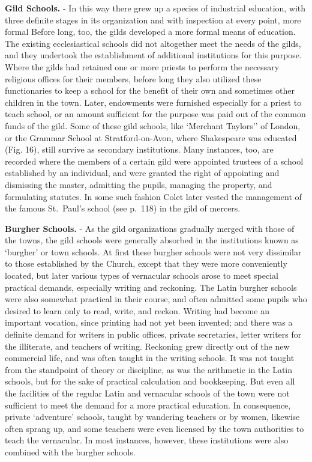 \documentclass[]{book}
\begin{document}
\textbf{Gild Schools.} - In this way there grew up a species of industrial education, with three definite stages in its organization and with inspection at every point, more formal Before long, too, the gilds developed a more formal means of education. The existing ecclesiastical schools did not altogether meet the needs of the gilds, and they undertook the establishment of additional institutions for this purpose. Where the gilds had retained one or more priests to perform the necessary religious offices for their members, before long they also utilized these functionaries to keep a school for the benefit of their own and sometimes other children in the town. Later, endowments were furnished especially for a priest to teach school, or an amount sufficient for the purpose was paid out of the common funds of the gild. Some of these gild schools, like `Merchant Taylors'' of London, or the Grammar School at Stratford-on-Avon, where Shakespeare was educated (Fig. 16), still survive as secondary institutions. Many instances, too, are recorded where the members of a certain gild were appointed trustees of a school established by an individual, and were granted the right of appointing and dismissing the master, admitting the pupils, managing the property, and formulating statutes. In some such fashion Colet later vested the management of the famous St.~Paul's school (see p.~118) in the gild of mercers.

\textbf{Burgher Schools.} - As the gild organizations gradually merged with those of the towns, the gild schools were generally absorbed in the institutions known as `burgher' or town schools. At first these burgher schools were not very dissimilar to those established by the Church, except that they were more conveniently located, but later various types of vernacular schools arose to meet special practical demands, especially writing and reckoning. The Latin burgher schools were also somewhat practical in their course, and often admitted some pupils who desired to learn only to read, write, and reckon. Writing had become an important vocation, since printing had not yet been invented; and there was a definite demand for writers in public offices, private secretaries, letter writers for the illiterate, and teachers of writing. Reckoning grew directly out of the new commercial life, and was often taught in the writing schools. It was not taught from the standpoint of theory or discipline, as was the arithmetic in the Latin schools, but for the sake of practical calculation and bookkeeping. But even all the facilities of the regular Latin and vernacular schools of the town were not sufficient to meet the demand for a more practical education. In consequence, private `adventure' schools, taught by wandering teachers or by women, likewise often sprang up, and some teachers were even licensed by the town authorities to teach the vernacular. In most instances, however, these institutions were also combined with the burgher schools.
\end{document}
